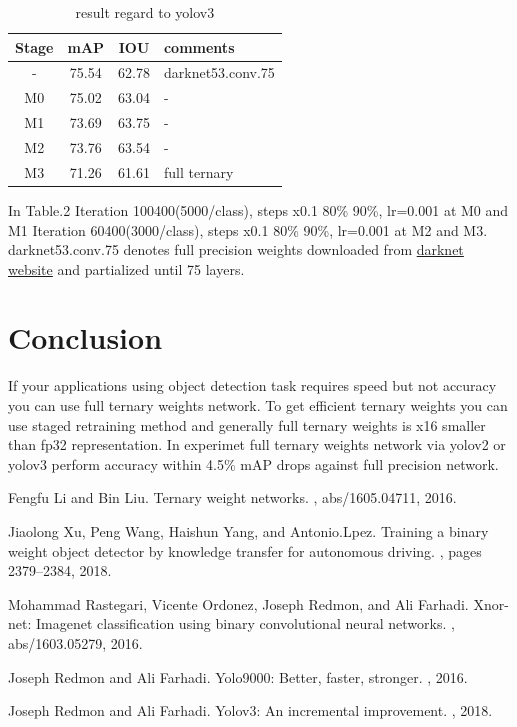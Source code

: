 \documentclass[10pt,a4paper,twocolumn]{article}
\begin{document}
\begin{table}[htbp]
 \centering
 \begin{tabular}{c|c|c|l}
  Stage & mAP & IOU & comments \\ \hline\hline
  -        & 75.54 & 62.78 & darknet53.conv.75 \\ \hline
  M0       & 75.02 & 63.04 & -                \\ \hline
  M1       & 73.69 & 63.75 & -                \\ \hline
  M2       & 73.76 & 63.54 & -                \\ \hline
  M3       & 71.26 & 61.61 & full ternary     \\ \hline\hline
 \end{tabular}
 \caption{result regard to yolov3}
 \label{tb:yolov3}
\end{table}

In Table.2 Iteration 100400(5000/class), steps x0.1 80\% 90\%, lr=0.001 at M0 and M1
Iteration 60400(3000/class), steps x0.1 80\% 90\%, lr=0.001 at M2 and M3.
darknet53.conv.75 denotes full precision weights downloaded from \href{https://pjreddie.com/darknet/yolo}{darknet website} and partialized until 75 layers.

\section{Conclusion}

If your applications using object detection task requires speed but not accuracy you can use full ternary weights network.
To get efficient ternary weights you can use staged retraining method and generally full ternary weights is x16 smaller than fp32 representation.
In experimet full ternary weights network via yolov2 or yolov3 perform accuracy within 4.5\% mAP drops against full precision network.

\begin{thebibliography}{1}

Fengfu Li and Bin Liu.
\newblock Ternary weight networks.
, abs/1605.04711, 2016.

Jiaolong Xu, Peng Wang, Haishun Yang, and Antonio.Lpez.
\newblock Training a binary weight object detector by knowledge transfer for
  autonomous driving.
, pages 2379--2384, 2018.

Mohammad Rastegari, Vicente Ordonez, Joseph Redmon, and Ali Farhadi.
\newblock Xnor-net: Imagenet classification using binary convolutional neural
  networks.
, abs/1603.05279, 2016.

Joseph Redmon and Ali Farhadi.
\newblock Yolo9000: Better, faster, stronger.
, 2016.

Joseph Redmon and Ali Farhadi.
\newblock Yolov3: An incremental improvement.
, 2018.

\end{thebibliography}
\end{document}
